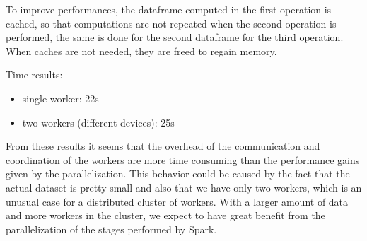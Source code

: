 \documentclass[10pt]{article}
\begin{document}
    To improve performances, the dataframe computed in the first operation is cached, so that computations are not repeated when the second operation is performed, the same is done for the second dataframe for the third operation. When caches are not needed, they are freed to regain memory.
    
    Time results:
    \begin{itemize}
    	\item single worker: 22s
    	\item two workers (different devices): 25s
    \end{itemize}

	From these results it seems that the overhead of the communication and coordination of the workers are more time consuming than the performance gains given by the parallelization. This behavior could be caused by the fact that the actual dataset is pretty small and also that we have only two workers, which is an unusual case for a distributed cluster of workers. With a larger amount of data and more workers in the cluster, we expect to have great benefit from the parallelization of the stages performed by Spark.
	
\end{document}
